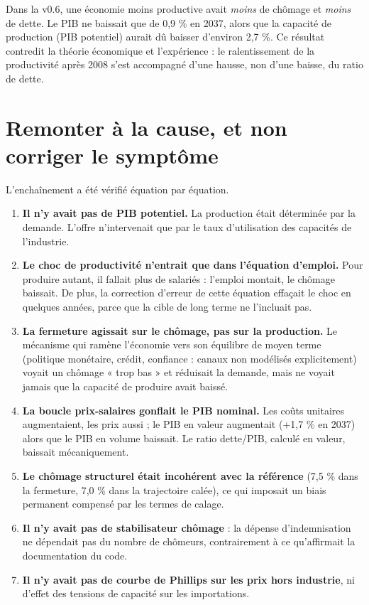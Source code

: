 \begin{limites}[Le paradoxe]
Dans la v0.6, une économie moins productive avait \emph{moins} de chômage et \emph{moins} de dette. Le PIB ne baissait
que de 0,9 \% en 2037, alors que la capacité de production (PIB potentiel) aurait dû baisser d'environ 2,7 \%. Ce
résultat contredit la théorie économique et l'expérience : le ralentissement de la productivité après 2008 s'est
accompagné d'une hausse, non d'une baisse, du ratio de dette.
\end{limites}

\section{Remonter à la cause, et non corriger le symptôme}

L'enchaînement a été vérifié équation par équation.
\begin{enumerate}
\item \textbf{Il n'y avait pas de PIB potentiel.} La production était déterminée par la demande. L'offre
n'intervenait que par le taux d'utilisation des capacités de l'industrie.
\item \textbf{Le choc de productivité n'entrait que dans l'équation d'emploi.} Pour produire autant, il fallait plus
de salariés : l'emploi montait, le chômage baissait. De plus, la correction d'erreur de cette équation effaçait le
choc en quelques années, parce que la cible de long terme ne l'incluait pas.
\item \textbf{La fermeture agissait sur le chômage, pas sur la production.} Le mécanisme qui ramène l'économie vers
son équilibre de moyen terme (politique monétaire, crédit, confiance : canaux non modélisés explicitement) voyait un
chômage « trop bas » et réduisait la demande, mais ne voyait jamais que la capacité de produire avait baissé.
\item \textbf{La boucle prix-salaires gonflait le PIB nominal.} Les coûts unitaires augmentaient, les prix aussi ; le
PIB en valeur augmentait (+1,7 \% en 2037) alors que le PIB en volume baissait. Le ratio dette/PIB, calculé en
valeur, baissait mécaniquement.
\item \textbf{Le chômage structurel était incohérent avec la référence} (7,5 \% dans la fermeture, 7,0 \% dans la
trajectoire calée), ce qui imposait un biais permanent compensé par les termes de calage.
\item \textbf{Il n'y avait pas de stabilisateur chômage} : la dépense d'indemnisation ne dépendait pas du nombre de
chômeurs, contrairement à ce qu'affirmait la documentation du code.
\item \textbf{Il n'y avait pas de courbe de Phillips sur les prix hors industrie}, ni d'effet des tensions de
capacité sur les importations.
\end{enumerate}

